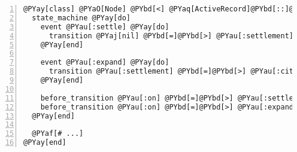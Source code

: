 \begin{Verbatim}[commandchars=@\[\],numbers=left,firstnumber=1,stepnumber=1]
@PYay[class] @PYaO[Node] @PYbd[<] @PYaq[ActiveRecord]@PYbd[::]@PYaq[Base]
  state_machine @PYay[do]
    event @PYau[:settle] @PYay[do]
      transition @PYaj[nil] @PYbd[=]@PYbd[>] @PYau[:settlement]
    @PYay[end]

    event @PYau[:expand] @PYay[do]
      transition @PYau[:settlement] @PYbd[=]@PYbd[>] @PYau[:city]
    @PYay[end]

    before_transition @PYau[:on] @PYbd[=]@PYbd[>] @PYau[:settle], @PYau[:do] @PYbd[=]@PYbd[>] @PYau[:build_settlement]
    before_transition @PYau[:on] @PYbd[=]@PYbd[>] @PYau[:expand], @PYau[:do] @PYbd[=]@PYbd[>] @PYau[:build_city]
  @PYay[end]

  @PYaf[# ...]
@PYay[end]
\end{Verbatim}
